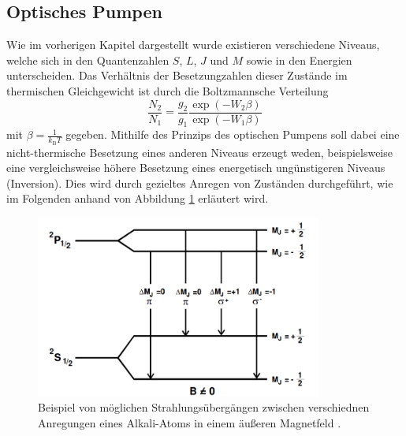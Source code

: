 \subsection{Optisches Pumpen}
Wie im vorherigen Kapitel dargestellt wurde existieren verschiedene Niveaus, welche sich in den Quantenzahlen $S$, $L$, $J$ und $M$ sowie in den Energien unterscheiden.
Das Verhältnis der Besetzungzahlen dieser Zustände im thermischen Gleichgewicht ist durch die Boltzmannsche Verteilung
\begin{equation}
  \frac{N_2}{N_1} = \frac{g_2}{g_1} \frac{ \exp{ \left( - W_2 \beta \right) }}{ \exp{ \left( - W_1 \beta \right)} }
  \label{eqn:1}
\end{equation}
mit $\beta = \frac{1}{k_\text{B} T}$ gegeben.
Mithilfe des Prinzips des optischen Pumpens soll dabei eine nicht-thermische Besetzung eines anderen Niveaus erzeugt weden, beispielsweise eine vergleichsweise höhere Besetzung eines energetisch ungünstigeren Niveaus (Inversion).
Dies wird durch gezieltes Anregen von Zuständen durchgeführt, wie im Folgenden anhand von Abbildung \ref{fig:theorie} erläutert wird.


\begin{figure}
  \centering
  \includegraphics[height=6cm]{ressources/theorie1.png}
  \caption{Beispiel von möglichen Strahlungsübergängen zwischen verschiednen Anregungen eines Alkali-Atoms in einem äußeren Magnetfeld \cite{skript}.}
  \label{fig:theorie}
\end{figure}

